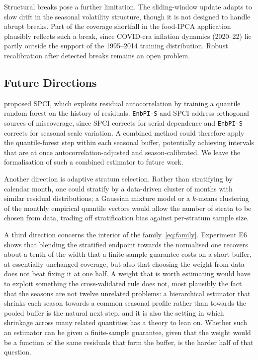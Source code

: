 Structural breaks pose a further limitation.  The sliding-window
update adapts to slow drift in the seasonal volatility structure,
though it is not designed to handle abrupt breaks.  Part of the
coverage shortfall in the food-IPCA application plausibly reflects
such a break, since COVID-era inflation dynamics (2020--22) lie
partly outside the support of the 1995--2014 training distribution.
Robust recalibration after detected breaks remains an open problem.

\subsection{Future Directions}
\label{sec:conclusion:future}

\citet{xu2023sequential} proposed SPCI, which exploits residual
autocorrelation by training a quantile random forest on the history
of residuals.  \texttt{EnbPI-S} and SPCI address orthogonal sources
of miscoverage, since SPCI corrects for serial dependence and
\texttt{EnbPI-S} corrects for seasonal scale variation.  A combined
method could therefore apply the quantile-forest step within each
seasonal buffer, potentially achieving intervals that are at once
autocorrelation-adjusted and season-calibrated.  We leave the
formalisation of such a combined estimator to future work.

Another direction is adaptive stratum selection.  Rather than
stratifying by calendar month, one could stratify by a data-driven
cluster of months with similar residual distributions; a Gaussian
mixture model or a $k$-means clustering of the monthly empirical
quantile vectors would allow the number of strata to be chosen from
data, trading off stratification bias against per-stratum sample
size.

A third direction concerns the interior of the family~\eqref{eq:family}.
Experiment E6 shows that blending the stratified endpoint towards the
normalised one recovers about a tenth of the width that a finite-sample
guarantee costs on a short buffer, at essentially unchanged coverage,
but also that choosing the weight from data does not beat fixing it at
one half.  A weight that is worth estimating would have to exploit
something the cross-validated rule does not, most plausibly the fact
that the seasons are not twelve unrelated problems: a hierarchical
estimator that shrinks each season towards a common seasonal profile
rather than towards the pooled buffer is the natural next step, and it
is also the setting in which shrinkage across many related quantities
has a theory to lean on.  Whether such an estimator can be given a
finite-sample guarantee, given that the weight would be a function of
the same residuals that form the buffer, is the harder half of that
question.


